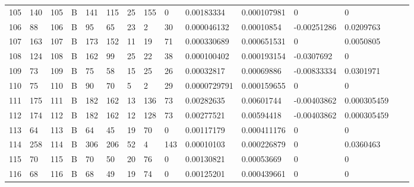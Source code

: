 \begin{longtable}{lllllllllllllll}
	105 & 140               & 105 & B   & 141               & 115               & 25                & 155  & 0          & 0.00183334     & 0.000107981    & 0             & 0            \\
	106 & 88                & 106 & B   & 95                & 65                & 23                & 2    & 30         & 0.000046132    & 0.00010854     & -0.00251286   & 0.0209763    \\
	107 & 163               & 107 & B   & 173               & 152               & 11                & 19   & 71         & 0.000330689    & 0.000651531    & 0             & 0.0050805    \\
	108 & 124               & 108 & B   & 162               & 99                & 25                & 22   & 38         & 0.000100402    & 0.000193154    & -0.0307692    & 0            \\
	109 & 73                & 109 & B   & 75                & 58                & 15                & 25   & 26         & 0.00032817     & 0.00069886     & -0.00833334   & 0.0301971    \\
	110 & 75                & 110 & B   & 90                & 70                & 5                 & 2    & 29         & 0.0000729791   & 0.000159655    & 0             & 0            \\
	111 & 175               & 111 & B   & 182               & 162               & 13                & 136  & 73         & 0.00282635     & 0.00601744     & -0.00403862   & 0.000305459  \\
	112 & 174               & 112 & B   & 182               & 162               & 12                & 128  & 73         & 0.00277521     & 0.00594418     & -0.00403862   & 0.000305459  \\
	113 & 64                & 113 & B   & 64                & 45                & 19                & 70   & 0          & 0.00117179     & 0.000411176    & 0             & 0            \\
	114 & 258               & 114 & B   & 306               & 206               & 52                & 4    & 143        & 0.00010103     & 0.000226879    & 0             & 0.0360463    \\
	115 & 70                & 115 & B   & 70                & 50                & 20                & 76   & 0          & 0.00130821     & 0.00053669     & 0             & 0            \\
	116 & 68                & 116 & B   & 68                & 49                & 19                & 74   & 0          & 0.00125201     & 0.000439661    & 0             & 0            \\

\end{longtable}
